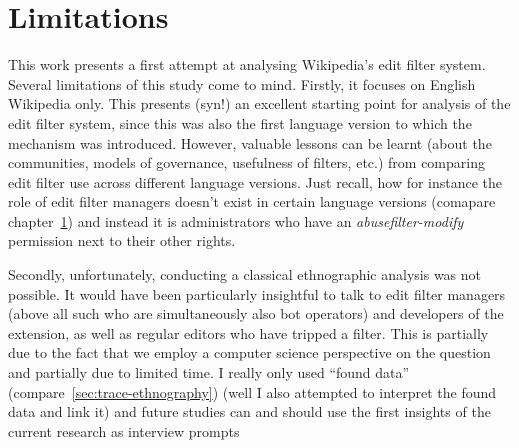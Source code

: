 \begin{comment}
Claudia: * A focus on the Good faith policies/guidelines is a historical development. After the huge surge in edits Wikipedia experienced starting 2005 the community needed a means to handle these (and the proportional amount of vandalism). They opted for automatisation. Automated system branded a lot of good faith edits as vandalism, which drove new comers away. A policy focus on good faith is part of the intentions to fix this.

 could be that the high hit count was made by false positives, which will have led to disabling the filter (TODO: that's a very interesting question actually; how do we know the high number of hits were actually leggit problems the filter wanted to catch and no false positives?)
--  we can't really? unless we study the edits themselves; I did this exemplarily for edits from the peak period in 2016; they were not false positives but a big spam wave.
\end{comment}


\section{Limitations}

This work presents a first attempt at analysing Wikipedia's edit filter system.
Several limitations of this study come to mind.
Firstly, it focuses on English Wikipedia only.
This presents (syn!) an excellent starting point for analysis of the edit filter system, since this was also the first language version to which the mechanism was introduced.
However, valuable lessons can be learnt (about the communities, models of governance, usefulness of filters, etc.) from comparing edit filter use across different language versions.
Just recall, how for instance the role of edit filter managers doesn't exist in certain language versions (comapare chapter~\ref{}) and instead it is administrators who have an \emph{abusefilter-modify} permission next to their other rights.

Secondly, unfortunately, conducting a classical ethnographic analysis was not possible.
It would have been particularly insightful to talk to edit filter managers (above all such who are simultaneously also bot operators) and developers of the extension, as well as regular editors who have tripped a filter.
This is partially due to the fact that we employ a computer science perspective on the question and partially due to limited time.
I really only used ``found data'' (compare~\ref{sec:trace-ethnography}) (well I also attempted to interpret the found data and link it) and future studies can and should use the first insights of the current research as interview prompts

